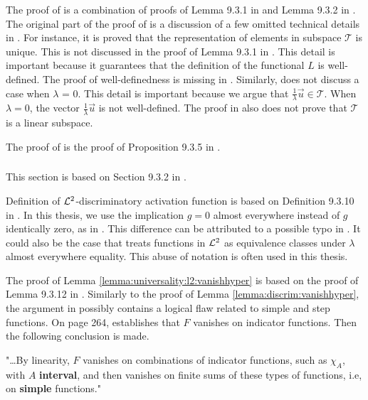 The proof of  is a combination of proofs of Lemma 9.3.1 in \cite{calin_2020_deep} and Lemma 9.3.2 in \cite{calin_2020_deep}. The original part of the proof of  is a discussion of a few omitted technical details in \cite{calin_2020_deep}. For instance, it is proved that the representation of elements in subspace $\mathcal{T}$ is unique. This is not discussed in the proof of  Lemma 9.3.1 in \cite{calin_2020_deep}. This detail is important because it guarantees that the definition of the functional $L$ is well-defined. The proof of well-definedness is missing in \cite{calin_2020_deep}. Similarly, \cite{calin_2020_deep} does not discuss a case when $\lambda$ = 0. This detail is important because we argue that $\frac{1}{\lambda} \vec{u} \in \mathcal{T}$. When $\lambda = 0$, the vector $\frac{1}{\lambda} \vec{u}$ is not well-defined. The proof in \cite{calin_2020_deep} also does not prove that $\mathcal{T}$ is a linear subspace.

The proof of  is the proof of Proposition 9.3.5 in \cite{calin_2020_deep}.

\subsubsection{}

This section is based on Section 9.3.2 in \cite{calin_2020_deep}.

Definition of ${\mathcal {L}^2}$-discriminatory activation function is based on Definition 9.3.10 in \cite{calin_2020_deep}. In this thesis, we use the implication $g = 0$ almost everywhere instead of $g$ identically zero, as in \cite{calin_2020_deep}. This difference can be attributed to a possible typo in \cite{calin_2020_deep}. It could also be the case that \cite{calin_2020_deep} treats functions in ${\mathcal {L}^2}$ as equivalence classes under $\lambda$ almost everywhere equality. This abuse of notation is often used in this thesis.

The proof of Lemma \ref{lemma:universality:l2:vanishhyper} is based on the proof of Lemma 9.3.12 in \cite{calin_2020_deep}.
Similarly to the proof of Lemma \ref{lemma:discrim:vanishhyper}, the argument in \cite{calin_2020_deep} possibly contains a logical flaw related to simple and step functions. On page 264, \cite{calin_2020_deep} establishes that $F$ vanishes on indicator functions. Then the following conclusion is made.
\begin{displayquote}
"\ldots By linearity, $F$ vanishes on combinations of indicator functions, such as $\chi_A$, with $A$ \textbf{interval}, and then vanishes on finite sums of these types of functions, i.e, on \textbf{simple} functions."
\end{displayquote}

